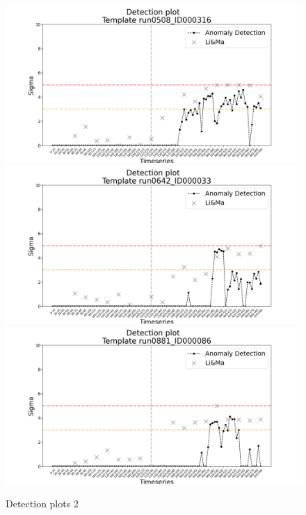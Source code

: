\begin{figure}[!htb]
    \includegraphics[width=1\textwidth]{figures/experiments/detection_plots/detection_plot_run0508_ID000316_testset_e.png}\hfill
    \\[\smallskipamount]

    \includegraphics[width=1\textwidth]{figures/experiments/detection_plots/detection_plot_run0642_ID000033_testset_e.png}\hfill
    \\[\smallskipamount]
    
    \includegraphics[width=1\textwidth]{figures/experiments/detection_plots/detection_plot_run0881_ID000086_testset_e.png}\hfill
    \\[\smallskipamount]
    \caption{Detection plots 2}\label{fig:detection-plots-2}
\end{figure}
\FloatBarrier
\section{}